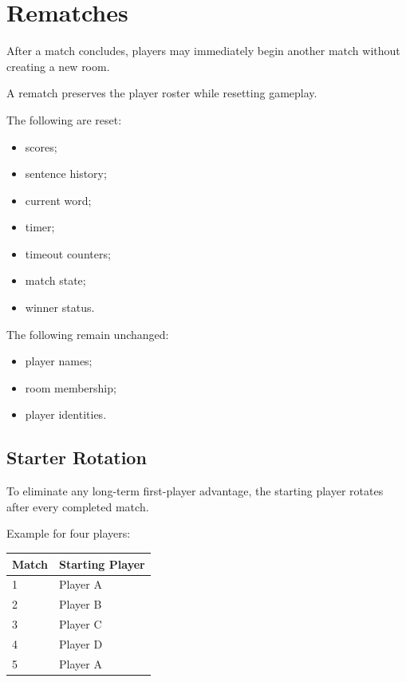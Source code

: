 \documentclass[11pt,a4paper]{article}
\begin{document}
\section{Rematches}

After a match concludes, players may immediately begin another match without creating a new room.

A rematch preserves the player roster while resetting gameplay.

The following are reset:

\begin{itemize}
    \item scores;
    \item sentence history;
    \item current word;
    \item timer;
    \item timeout counters;
    \item match state;
    \item winner status.
\end{itemize}

The following remain unchanged:

\begin{itemize}
    \item player names;
    \item room membership;
    \item player identities.
\end{itemize}

\subsection{Starter Rotation}

To eliminate any long-term first-player advantage, the starting player rotates after every completed match.

Example for four players:

\begin{center}
\begin{tabular}{ll}
\toprule
Match & Starting Player\\
\midrule
1 & Player A\\
2 & Player B\\
3 & Player C\\
4 & Player D\\
5 & Player A\\
\bottomrule
\end{tabular}
\end{center}
\end{document}
